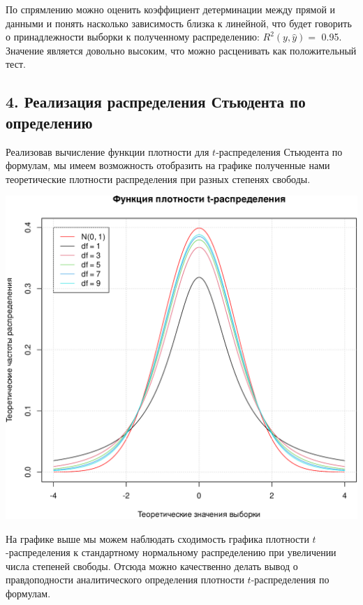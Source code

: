 \documentclass[
]{article}
\begin{document}
По спрямлению можно оценить коэффициент детерминации между прямой и
данными и понять насколько зависимость близка к линейной, что будет
говорить о принадлежности выборки к полученному распределению:
\(R^2(y, \hat{y}) =\) 0.95. Значение является довольно высоким, что
можно расценивать как положительный тест.

\hypertarget{ux440ux435ux430ux43bux438ux437ux430ux446ux438ux44f-ux440ux430ux441ux43fux440ux435ux434ux435ux43bux435ux43dux438ux44f-ux441ux442ux44cux44eux434ux435ux43dux442ux430-ux43fux43e-ux43eux43fux440ux435ux434ux435ux43bux435ux43dux438ux44e}{%
\subsection{4. Реализация распределения Стьюдента по
определению}\label{ux440ux435ux430ux43bux438ux437ux430ux446ux438ux44f-ux440ux430ux441ux43fux440ux435ux434ux435ux43bux435ux43dux438ux44f-ux441ux442ux44cux44eux434ux435ux43dux442ux430-ux43fux43e-ux43eux43fux440ux435ux434ux435ux43bux435ux43dux438ux44e}}

Реализовав вычисление функции плотности для \(t\)-распределения
Стьюдента по формулам, мы имеем возможность отобразить на графике
полученные нами теоретические плотности распределения при разных
степенях свободы.

\begin{center}\includegraphics[width=0.6\linewidth]{Prac4_files/figure-latex/unnamed-chunk-9-1} \end{center}

На графике выше мы можем наблюдать сходимость графика плотности
\(t\)-распределения к стандартному нормальному распределению при
увеличении числа степеней свободы. Отсюда можно качественно делать вывод
о правдоподности аналитического определения плотности
\(t\)-распределения по формулам.
\end{document}
